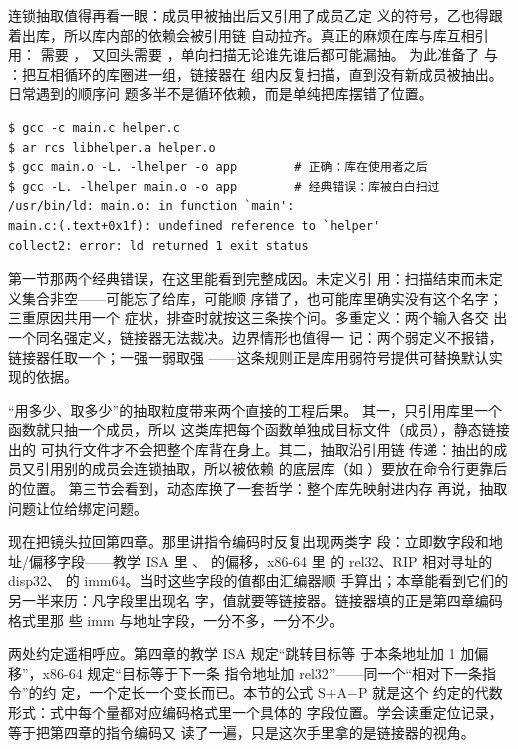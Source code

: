 连锁抽取值得再看一眼：成员甲被抽出后又引用了成员乙定
义的符号，乙也得跟着出库，所以库内部的依赖会被引用链
自动拉齐。真正的麻烦在库与库互相引用：
需要 ， 又回头需要
，单向扫描无论谁先谁后都可能漏抽。
 为此准备了  与
：把互相循环的库圈进一组，链接器在
组内反复扫描，直到没有新成员被抽出。日常遇到的顺序问
题多半不是循环依赖，而是单纯把库摆错了位置。

\begin{lstlisting}
$ gcc -c main.c helper.c
$ ar rcs libhelper.a helper.o
$ gcc main.o -L. -lhelper -o app        # 正确：库在使用者之后
$ gcc -L. -lhelper main.o -o app        # 经典错误：库被白白扫过
/usr/bin/ld: main.o: in function `main':
main.c:(.text+0x1f): undefined reference to `helper'
collect2: error: ld returned 1 exit status
\end{lstlisting}

第一节那两个经典错误，在这里能看到完整成因。未定义引
用：扫描结束而未定义集合非空——可能忘了给库，可能顺
序错了，也可能库里确实没有这个名字；三重原因共用一个
症状，排查时就按这三条挨个问。多重定义：两个输入各交
出一个同名强定义，链接器无法裁决。边界情形也值得一
记：两个弱定义不报错，链接器任取一个；一强一弱取强
——这条规则正是库用弱符号提供可替换默认实现的依据。

“用多少、取多少”的抽取粒度带来两个直接的工程后果。
其一，只引用库里一个函数就只抽一个成员，所以
 这类库把每个函数单独成目标文件（成员），静态链接出的
可执行文件才不会把整个库背在身上。其二，抽取沿引用链
传递：抽出的成员又引用别的成员会连锁抽取，所以被依赖
的底层库（如 ）要放在命令行更靠后的位置。
第三节会看到，动态库换了一套哲学：整个库先映射进内存
再说，抽取问题让位给绑定问题。

现在把镜头拉回第四章。那里讲指令编码时反复出现两类字
段：立即数字段和地址/偏移字段——教学 ISA 里
、 的偏移，x86-64 里
 的 rel32、RIP 相对寻址的 disp32、
 的 imm64。当时这些字段的值都由汇编器顺
手算出；本章能看到它们的另一半来历：凡字段里出现名
字，值就要等链接器。链接器填的正是第四章编码格式里那
些 imm 与地址字段，一分不多，一分不少。

两处约定遥相呼应。第四章的教学 ISA 规定“跳转目标等
于本条地址加 1 加偏移”，x86-64 规定“目标等于下一条
指令地址加 rel32”——同一个“相对下一条指令”的约
定，一个定长一个变长而已。本节的公式 S+A−P 就是这个
约定的代数形式：式中每个量都对应编码格式里一个具体的
字段位置。学会读重定位记录，等于把第四章的指令编码又
读了一遍，只是这次手里拿的是链接器的视角。

